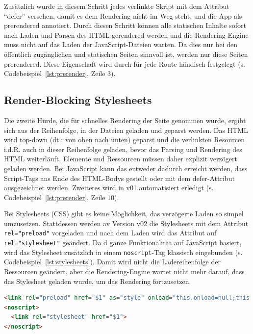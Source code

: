 \documentclass[11pt,a4paper]{article}
\begin{document}
Zusätzlich wurde in diesem Schritt jedes verlinkte Skript mit dem Attribut \enquote{defer} versehen, damit es dem Rendering nicht im Weg steht, und die App als prerendered annotiert. 
Durch diesen Schritt können alle statischen Inhalte sofort nach Laden und Parsen des HTML gerendered werden und die Rendering-Engine muss nicht auf das Laden der JavaScript-Dateien warten.
Da dies nur bei den öffentlich zugänglichen und statischen Seiten sinnvoll ist, werden nur diese Seiten prerendered.
Diese Eigenschaft wird durch für jede Route händisch festgelegt (s. Codebeispiel~\ref{lst:prerender}, Zeile 3).

\subsection{Render-Blocking Stylesheets}
Die zweite Hürde, die für schnelles Rendering der Seite genommen wurde, ergibt sich aus der Reihenfolge, in der Dateien geladen und geparst werden.
Das HTML wird top-down (dt.: von oben nach unten) geparst und die verlinkten Resourcen i.d.R. auch in dieser Reihenfolge geladen, bevor das Parsing und Rendering des HTML weiterläuft.
Elemente und Ressourcen müssen daher explizit verzögert geladen werden.
Bei JavaScript kann das entweder dadurch erreicht werden, dass Script-Tags ans Ende des HTML-Bodys gestellt oder mit dem defer-Attribut ausgezeichnet werden.
Zweiteres wird in v01 automatisiert erledigt (s. Codebeispiel~\ref{lst:prerender}, Zeile 10).

Bei Stylesheets (CSS) gibt es keine Möglichkeit, das verzögerte Laden so simpel umzusetzen.
Stattdessen werden av Version v02 die Stylesheets mit dem Attribut \verb|rel="preload"| vorgeladen und nach dem Laden wird das Attribut auf \verb|rel="stylesheet"| geändert.
Da d ganze Funktionalität auf JavaScript basiert, wird das Stylesheet zusätzlich in einem \verb|noscript|-Tag klassisch eingebunden (s. Codebeispiel~\ref{lst:stylesheets}). 
Damit wird nicht die Ladereihenfolge der Ressourcen geändert, aber die Rendering-Engine wartet nicht mehr darauf, dass das Stylesheet geladen wurde, um das Rendering fortzusetzen.

\begin{lstlisting}[language=html, caption={Entfernte Render-Blocking Stylesheets (\enquote{\$1} steht für den jeweiligen Quellpfad für das Stylesheet)}, label={lst:stylesheets}]
<link rel="preload" href="$1" as="style" onload="this.onload=null;this.rel='stylesheet'">
<noscript>
  <link rel="stylesheet" href="$1">
</noscript>
\end{lstlisting}
\end{document}
